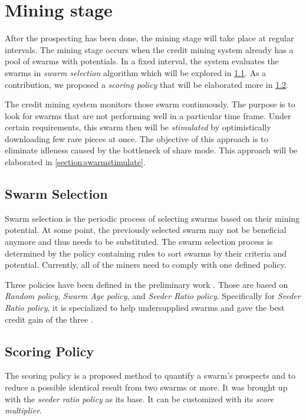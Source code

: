\section{Mining stage}
After the prospecting has been done, the mining stage will take place at regular intervals. The mining stage occurs when the credit mining system already has a pool of swarms with potentials. In a fixed interval, the system evaluates the swarms in \textit{swarm selection} algorithm which will be explored in \ref{section:swarmselect}. As a contribution, we proposed a \textit{scoring policy} that will be elaborated more in \ref{section:scorepolicy}.

The credit mining system monitors those swarm continuously. The purpose is to look for swarms that are not performing well in a particular time frame. Under certain requirements, this swarm then will be \textit{stimulated} by optimistically downloading few rare pieces at once. The objective of this approach is to eliminate idleness caused by the bottleneck of share mode. This approach will be elaborated in \ref{section:swarmstimulate}.

\subsection{Swarm Selection}
\label{section:swarmselect}
Swarm selection is the periodic process of selecting swarms based on their mining potential. At some point, the previously selected swarm may not be beneficial anymore and thus needs to be substituted. The swarm selection process is determined by the policy containing rules to sort swarms by their criteria and potential. Currently, all of the miners need to comply with one defined policy.

Three policies have been defined in the preliminary work \cite{2015:creditmining:capota}. Those are based on \textit{Random policy}, \textit{Swarm Age policy}, and \textit{Seeder Ratio policy}. Specifically for \textit{Seeder Ratio policy}, it is specialized to help undersupplied swarms and gave the best credit gain of the three \cite{2015:creditmining:capota}.

\subsection{Scoring Policy}
\label{section:scorepolicy}
The scoring policy is a proposed method to quantify a swarm's prospects and to reduce a possible identical result from two swarms or more. It was brought up with the \textit{seeder ratio policy} as its base. It can be customized with its \textit{score multiplier}.

